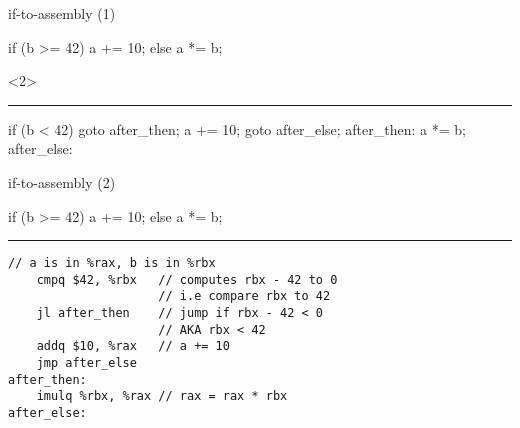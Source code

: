 \begin{frame}[fragile,label=ifToAsm1]{if-to-assembly (1)}
\begin{ccodeNL}
if (b >= 42) {
    a += 10;
} else {
    a *= b;
}
\end{ccodeNL}
\begin{visibleenv}<2>
\hrule
\begin{ccodeNL}
            if (b < 42) goto after_then;
            a += 10;
            goto after_else;
after_then: a *= b;
after_else:
\end{ccodeNL}
\end{visibleenv}
\end{frame}

\begin{frame}[fragile,label=ifToAsm2]{if-to-assembly (2)}
\begin{ccodeNL}
if (b >= 42) {
    a += 10;
} else {
    a *= b;
}
\end{ccodeNL}
\hrule
\begin{lstlisting}[language=myasm,style=small]
// a is in %rax, b is in %rbx
    cmpq $42, %rbx   // computes rbx - 42 to 0
                     // i.e compare rbx to 42
    jl after_then    // jump if rbx - 42 < 0 
                     // AKA rbx < 42
    addq $10, %rax   // a += 10
    jmp after_else
after_then:
    imulq %rbx, %rax // rax = rax * rbx
after_else:
\end{lstlisting}
\end{frame}

